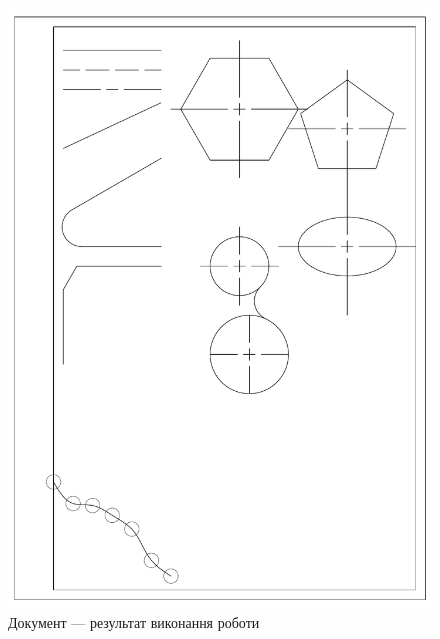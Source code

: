 \documentclass[
	a4paper,
	oneside,
	BCOR = 10mm,
	DIV = 12,
	12pt,
	headings = normal,
]{scrartcl}
\begin{document}
		\begin{figure}[!htbp]
			\centering
			\includegraphics[width=\columnwidth]{./assets/klokun-v03-var-08.pdf}
			\caption{Документ — результат виконання роботи}
			\label{fig:doc-result}
		\end{figure}
\end{document}
